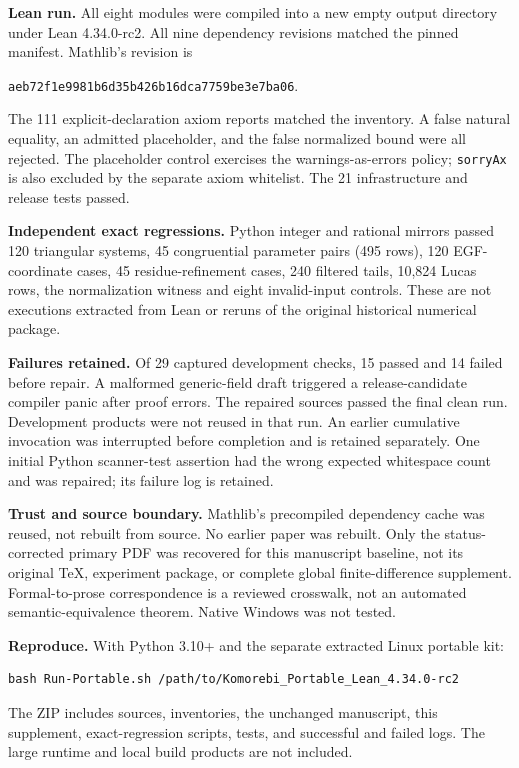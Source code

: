 \documentclass[11pt]{article}
\begin{document}
\textbf{Lean run.} All eight modules were compiled into a new empty output directory under Lean 4.34.0-rc2. All nine dependency revisions matched the pinned manifest. Mathlib's revision is\par
{\footnotesize\texttt{aeb72f1e9981b6d35b426b16dca7759be3e7ba06}.}

The 111 explicit-declaration axiom reports matched the inventory. A false natural equality, an admitted placeholder, and the false normalized bound were all rejected. The placeholder control exercises the warnings-as-errors policy; \texttt{sorryAx} is also excluded by the separate axiom whitelist. The 21 infrastructure and release tests passed.

\textbf{Independent exact regressions.} Python integer and rational mirrors passed 120 triangular systems, 45 congruential parameter pairs (495 rows), 120 EGF-coordinate cases, 45 residue-refinement cases, 240 filtered tails, 10,824 Lucas rows, the normalization witness and eight invalid-input controls. These are not executions extracted from Lean or reruns of the original historical numerical package.

\textbf{Failures retained.} Of 29 captured development checks, 15 passed and 14 failed before repair. A malformed generic-field draft triggered a release-candidate compiler panic after proof errors. The repaired sources passed the final clean run. Development products were not reused in that run. An earlier cumulative invocation was interrupted before completion and is retained separately. One initial Python scanner-test assertion had the wrong expected whitespace count and was repaired; its failure log is retained.

\textbf{Trust and source boundary.} Mathlib's precompiled dependency cache was reused, not rebuilt from source. No earlier paper was rebuilt. Only the status-corrected primary PDF was recovered for this manuscript baseline, not its original TeX, experiment package, or complete global finite-difference supplement. Formal-to-prose correspondence is a reviewed crosswalk, not an automated semantic-equivalence theorem. Native Windows was not tested.

\textbf{Reproduce.} With Python 3.10+ and the separate extracted Linux portable kit:
\begin{verbatim}
bash Run-Portable.sh /path/to/Komorebi_Portable_Lean_4.34.0-rc2
\end{verbatim}
The ZIP includes sources, inventories, the unchanged manuscript, this supplement, exact-regression scripts, tests, and successful and failed logs. The large runtime and local build products are not included.
\end{document}

